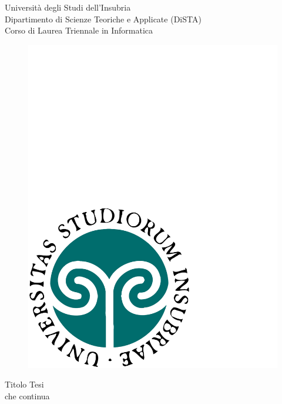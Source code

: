 \begin{titlepage}
  \begin{center}
  \begin{large}
  {\fontsize{20}{18}\selectfont\vspace*{0.50cm}Universit\`a degli Studi dell'Insubria}\\
  Dipartimento di Scienze Teoriche e Applicate (DiSTA)\\
  Corso di Laurea Triennale in Informatica
  \end{large}
  
  \vspace{1cm}
  \begin{figure}[h]
    \begin{center}
      \includegraphics[scale=0.25]{copertina/logounivector.pdf}
    \end{center}
  \end{figure}

    {
      \fontsize{26}{26}\selectfont\par\vspace*{0.75cm}
      Titolo Tesi\\
      \vspace{.15em}che continua
    }
    \par
    

\end{center}
\end{titlepage}

